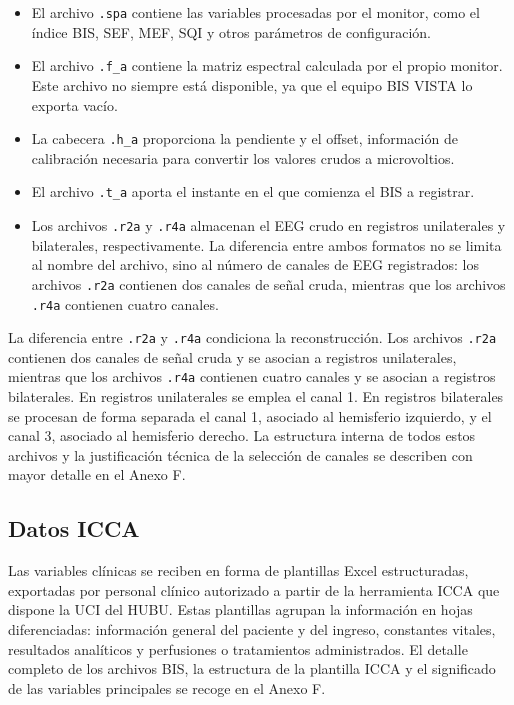 \documentclass[
  spanish,
  a4paper,
  12pt,
  twoside]{memoir}
\begin{document}
\begin{itemize}
\item
  El archivo \texttt{.spa} contiene las variables procesadas por el
  monitor, como el índice BIS, SEF, MEF, SQI y otros parámetros de
  configuración.
\item
  El archivo \texttt{.f\_a} contiene la matriz espectral calculada por
  el propio monitor. Este archivo no siempre está disponible, ya que el
  equipo BIS VISTA lo exporta vacío.
\item
  La cabecera \texttt{.h\_a} proporciona la pendiente y el offset,
  información de calibración necesaria para convertir los valores crudos
  a microvoltios.
\item
  El archivo \texttt{.t\_a} aporta el instante en el que comienza el BIS
  a registrar.
\item
  Los archivos \texttt{.r2a} y \texttt{.r4a} almacenan el EEG crudo en
  registros unilaterales y bilaterales, respectivamente. La diferencia
  entre ambos formatos no se limita al nombre del archivo, sino al
  número de canales de EEG registrados: los archivos \texttt{.r2a}
  contienen dos canales de señal cruda, mientras que los archivos
  \texttt{.r4a} contienen cuatro canales.
\end{itemize}

La diferencia entre \texttt{.r2a} y \texttt{.r4a} condiciona la
reconstrucción. Los archivos \texttt{.r2a} contienen dos canales de
señal cruda y se asocian a registros unilaterales, mientras que los
archivos \texttt{.r4a} contienen cuatro canales y se asocian a registros
bilaterales. En registros unilaterales se emplea el canal 1. En
registros bilaterales se procesan de forma separada el canal 1, asociado
al hemisferio izquierdo, y el canal 3, asociado al hemisferio derecho.
La estructura interna de todos estos archivos y la justificación técnica
de la selección de canales se describen con mayor detalle en el Anexo F.

\subsection{Datos ICCA}\label{datos-icca}

Las variables clínicas se reciben en forma de plantillas Excel
estructuradas, exportadas por personal clínico autorizado a partir de la
herramienta ICCA que dispone la UCI del HUBU. Estas plantillas agrupan
la información en hojas diferenciadas: información general del paciente
y del ingreso, constantes vitales, resultados analíticos y perfusiones o
tratamientos administrados. El detalle completo de los archivos BIS, la
estructura de la plantilla ICCA y el significado de las variables
principales se recoge en el Anexo F.
\end{document}
